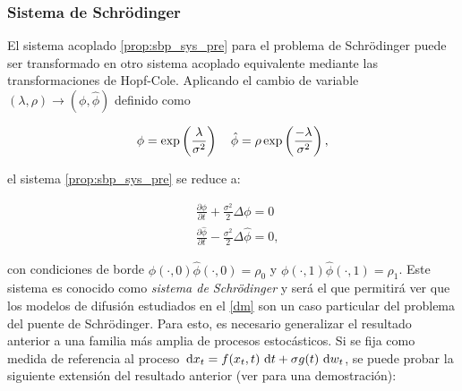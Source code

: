 \subsubsection{Sistema de Schrödinger}

El sistema acoplado \eqref{prop:sbp_sys_pre} para el problema de Schrödinger puede ser transformado en otro sistema acoplado equivalente mediante las transformaciones de Hopf-Cole. Aplicando el cambio de variable $(\lambda,\rho)\to(\phi,\hat\phi)$ definido como

\begin{equation*}
	\phi = \exp\left(\frac{\lambda}{\sigma^2}\right)
	\quad
	\hat\phi = \rho\exp\left(\frac{-\lambda}{\sigma^2}\right),
\end{equation*}

el sistema \eqref{prop:sbp_sys_pre} se reduce a:

\begin{align}
	&\frac{\partial\phi}{\partial t} + \frac{\sigma^2}{2}\Delta\phi = 0\\
	&\frac{\partial\hat\phi}{\partial t} - \frac{\sigma^2}{2}\Delta\hat\phi = 0,
\end{align}

con condiciones de borde $\phi(\cdot,0)\hat\phi(\cdot,0) = \rho_0$ y $\phi(\cdot,1)\hat\phi(\cdot,1) = \rho_1$. Este sistema es conocido como \textit{sistema de Schrödinger} y será el que permitirá ver que los modelos de difusión estudiados en el \autoref{dm} son un caso particular del problema del puente de Schrödinger. Para esto, es necesario generalizar el resultado anterior a una familia más amplia de procesos estocásticos. Si se fija como medida de referencia al proceso $\,\operatorname{d}\! x_t = f(x_t,t)\,\operatorname{d}\! t + \sigma g(t)\,\operatorname{d}\! w_t$, se puede probar la siguiente extensión del resultado anterior (ver \cite{chen2020stochasticcontrolliaisonsrichard} para una demostración):

